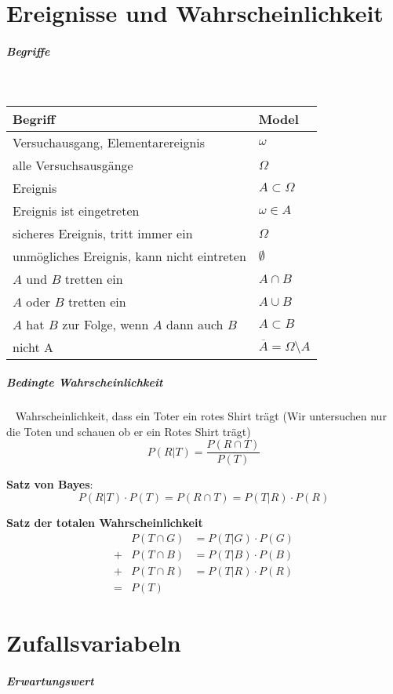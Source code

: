 \documentclass[10pt,twoside,landscape]{article}
\begin{document}
\begin{multicols}{2}
\section{Ereignisse und Wahrscheinlichkeit}
\label{sec:org5bb73e0}
\subparagraph{Begriffe} \
\label{sec:org7568906}
\begin{center}
\begin{tabular}{ll}
Begriff & Model\\[0pt]
\hline
Versuchausgang, Elementarereignis & \(\omega\)\\[0pt]
alle Versuchsausgänge & \(\Omega\)\\[0pt]
Ereignis & \(A \subset \Omega\)\\[0pt]
Ereignis ist eingetreten & \(\omega \in A\)\\[0pt]
sicheres Ereignis, tritt immer ein & \(\Omega\)\\[0pt]
unmögliches Ereignis, kann nicht eintreten & \(\emptyset\)\\[0pt]
\(A\) und \(B\) tretten ein & \(A \cap B\)\\[0pt]
\(A\) oder \(B\) tretten ein & \(A \cup B\)\\[0pt]
\(A\) hat \(B\) zur Folge, wenn \(A\) dann auch \(B\) & \(A \subset B\)\\[0pt]
nicht A & \(\overline{A} = \Omega \setminus A\)\\[0pt]
\end{tabular}
\end{center}
\subparagraph{Bedingte Wahrscheinlichkeit} \
\label{sec:org6ca9db5}
Wahrscheinlichkeit, dass ein Toter ein rotes Shirt trägt (Wir untersuchen nur die Toten und schauen ob er ein Rotes Shirt trägt)
\[
P(R|T) = \frac{P(R \cap T)}{P(T)}
\]

\textbf{Satz von Bayes}:
\[
P(R|T) \cdot P(T) = P(R \cap T) = P(T|R) \cdot P(R)
\]

\textbf{Satz der totalen Wahrscheinlichkeit}
\begin{align*}
&P(T \cap G) &= P(T|G) \cdot P(G) \\
+&P(T \cap B) &= P(T|B) \cdot P(B) \\
+&P(T \cap R) &= P(T|R) \cdot P(R) \\
=&P(T)
\end{align*}
\section{Zufallsvariabeln}
\label{sec:org474bb27}
\subparagraph{Erwartungswert} \
\label{sec:org03fe57d}


\end{multicols}
\end{document}
